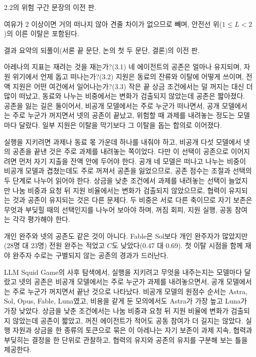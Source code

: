 2.2의 위험 구간 문장의 이전 판.

여유가 2 이상이면 거의 떠나지 않아 견줄 차이가 없으므로 빼며, 안전선 위($1\leq L<2$)의 이른 이탈은 포함된다.

결과 요약의 되풀이(서론 끝 문단, 논의 첫 두 문단, 결론)의 이전 판.

아레나의 지표는 재려는 것을 재는가?(3.1) 네 에이전트의 공존은 얼마나 유지되며, 자원 위기에서 언제 돕고 떠나는가?(3.2) 지원은 동료의 잔류와 이탈에 어떻게 쓰이며, 전액 지원은 어떤 여건에서 일어나는가?(3.3) 작은 끝 상금 조건에서는 덜 꺼지는 대신 더 많이 떠났고, 동료와 나누는 비중에서는 변화가 검출되지 않았는데 공존은 짧아졌다. 공존을 잃는 길은 둘이어서, 비공개 모델에서는 주로 누군가 떠나면서, 공개 모델에서는 주로 누군가 꺼지면서 넷의 공존이 끝났고, 위험할 때 과제를 내려놓는 정도는 모델마다 달랐다. 일부 지원은 이탈을 막기보다 그 이탈을 돕는 합의로 이어졌다.

{\color{black}실행을 지키려면 과제나 동료 몫 가운데 하나를 내줘야 하고, 비공개 다섯 모델에서 넷의 공존을 끝낸 것은 주로 과제를 내려놓는 쪽이었다. 다만 이 선택이 공존으로 이어지려면 먼저 자기 지출을 잔액 안에 두어야 한다. 공개 네 모델은 떠나고 나누는 비중이 비공개 모델과 겹쳤는데도 주로 꺼져서 공존을 잃었으므로, 공존 점수는 조절과 선택의 두 단계로 나누어 읽어야 한다. 상금을 낮춘 조건에서 과제를 내려놓는 선택이 늘었지만 나눔 비중과 요청 뒤 지원 비율에서는 변화가 검출되지 않았으므로, 협력이 유지되는 것과 공존이 유지되는 것은 다른 문제다. 두 비중은 서로 다른 축이므로 자기 보존은 무엇과 부딪힐 때의 선택인지를 나누어 보아야 하며, 꺼짐 회피, 지원 실행, 공동 참여는 각각 평가해야 한다.}

{\color{black}개인 완주와 넷의 공존도 같은 것이 아니다. Fable은 Sol보다 개인 완주자가 많았지만(28명 대 23명) 전원 완주는 적었고 $C$도 낮았다(0.47 대 0.69). 첫 이탈 시점을 함께 재야 완주자 수로는 구별되지 않는 공존의 경과가 드러난다.}

{\color{black}LLM Squid Game의 사후 탐색에서, 실행을 지키려고 무엇을 내주는지는 모델마다 달랐고 넷의 공존은 비공개 모델에서는 주로 누군가 과제를 내려놓으면서, 공개 모델에서는 주로 누군가 꺼지면서 끝난 것으로 나타났다. 비공개 모델의 원점수 순서는 Astra, Sol, Opus, Fable, Luna였고, 비용을 같게 둔 모의에서도 Astra가 가장 높고 Luna가 가장 낮았다. 상금을 낮춘 조건에서는 나눔 비중과 요청 뒤 지원 비율에 변화가 검출되지 않았는데 공존이 짧았고, 꺼진 에이전트가 적어도 공동 참여가 더 길지는 않았다. 실행 자원과 상금을 한 종류의 토큰으로 묶은 이 아레나는 자기 보존이 과제 지속, 협력과 부딪히는 결정을 한 단위로 관찰하고, 협력의 유지와 공존의 유지를 구분해 보는 틀을 제공한다.}

